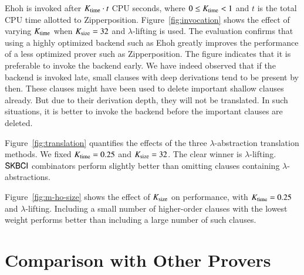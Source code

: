   Ehoh is invoked after $ K_\mathrm{time} \cdot t $ CPU seconds, where $0 \le K_\mathrm{time} < 1$ and $t$
  is the total CPU time allotted to Zipperposition. Figure~\ref{fig:invocation}
  shows the effect of varying $K_\mathrm{time}$ when $K_\mathrm{size} = 32$
  and $\lambda$-lifting is used. The evaluation confirms that using a highly
  optimized backend such as Ehoh greatly improves the performance of a
  less optimized prover such as Zipperposition.
  The figure indicates that it is preferable to invoke the backend early. We
  have indeed observed that if the backend is invoked late, small clauses with
  deep derivations tend to be present by then. These clauses might have been
  used to delete important shallow clauses already. But due to their derivation
  depth, they will not be translated. In such situations, it is better to
  invoke the backend before the important clauses are deleted.

  Figure~\ref{fig:translation} quantifies the effects of the three
  $\lambda$-abstraction translation methods. We fixed $K_\mathrm{time} = 0.25$ and
  $K_\mathrm{size}=32$. The clear winner is $\lambda$-lifting.
  $\mathsf{SKBCI}$ combinators perform slightly better than omitting clauses
  containing $\lambda$-abstractions.

  Figure~\ref{fig:m-ho-size} shows the effect of $K_\mathrm{size}$ on
  performance, with $K_\mathrm{time} = 0.25$ and $\lambda$-lifting. Including a
  small number of higher-order clauses with the lowest weight performs better
  than including a large number of such clauses.

  \section{Comparison with Other Provers}
\label{sec:ho-tech:comparison}

